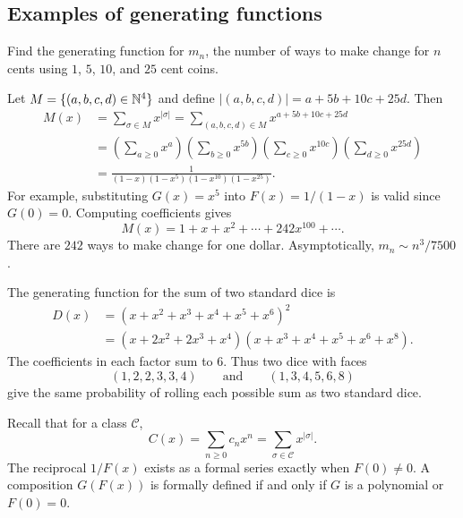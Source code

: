 \subsection{Examples of generating functions}
\begin{example}
Find the generating function for $m_n$, the number of ways to make change for $n$ cents using $1$, $5$, $10$, and $25$ cent coins.\par\medskip
Let $M=\{(a,b,c,d)\in\mathbb{N}^4\}$ and define $|(a,b,c,d)|=a+5b+10c+25d$. Then
\begin{align*}
M(x)&=\sum_{\sigma\in M}x^{|\sigma|}
=\sum_{(a,b,c,d)\in M}x^{a+5b+10c+25d}\\
&=\left(\sum_{a\ge0}x^a\right)
\left(\sum_{b\ge0}x^{5b}\right)
\left(\sum_{c\ge0}x^{10c}\right)
\left(\sum_{d\ge0}x^{25d}\right)\\
&=\frac1{(1-x)(1-x^5)(1-x^{10})(1-x^{25})}.
\end{align*}
For example, substituting $G(x)=x^5$ into $F(x)=1/(1-x)$ is valid since $G(0)=0$.
Computing coefficients gives
\[
M(x)=1+x+x^2+\cdots+242x^{100}+\cdots.
\]
There are $242$ ways to make change for one dollar. Asymptotically, $m_n\sim n^3/7500$.
\end{example}
\begin{example}
The generating function for the sum of two standard dice is
\begin{align*}
D(x)&=(x+x^2+x^3+x^4+x^5+x^6)^2\\
&=(x+2x^2+2x^3+x^4)(x+x^3+x^4+x^5+x^6+x^8).
\end{align*}
The coefficients in each factor sum to $6$. Thus two dice with faces
\[
(1,2,2,3,3,4)\qquad\text{and}\qquad(1,3,4,5,6,8)
\]
give the same probability of rolling each possible sum as two standard dice.
\end{example}
\begin{remark}
Recall that for a class $\mathcal C$,
\[
C(x)=\sum_{n\ge0}c_nx^n=\sum_{\sigma\in\mathcal C}x^{|\sigma|}.
\]
The reciprocal $1/F(x)$ exists as a formal series exactly when $F(0)\ne0$. A composition $G(F(x))$ is formally defined if and only if $G$ is a polynomial or $F(0)=0$.
\end{remark}

